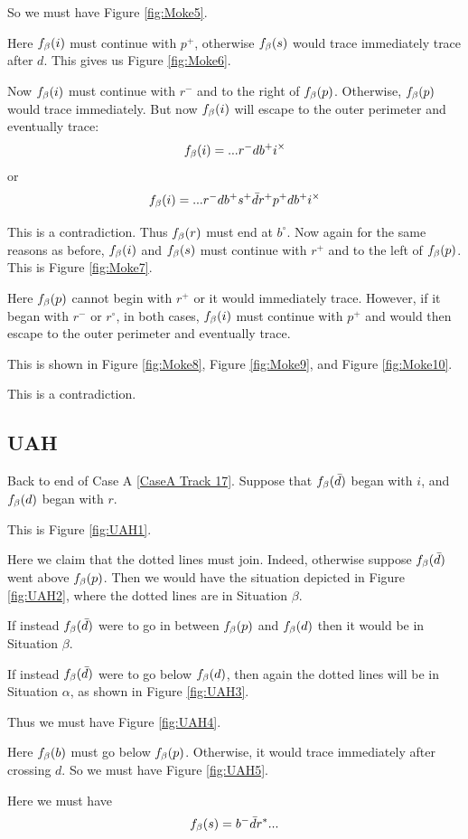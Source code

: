 So we must have Figure \ref{fig:Moke5}.

Here $f_\beta(i)$ must continue with $p^+$, otherwise $f_\beta(s)$ would trace immediately trace after $d$. This gives us Figure \ref{fig:Moke6}.

Now $f_\beta(i)$ must continue with $r^-$ and to the right of $f_\beta(p)$. Otherwise, $f_\beta(p)$ would trace immediately. But now $f_\beta(i)$ will escape to the outer perimeter and eventually trace:
\[
f_\beta(i) = ...r^- d b^+ i^\times
\]
or
\[
f_\beta(i) = ...r^- d b^+ s^+ \bar{d} r^+ p^+ d b^+ i^\times
\]

This is a contradiction. Thus $f_\beta(r)$ must end at $b^\circ$. Now again for the same reasons as before, $f_\beta(i)$ and $f_\beta(s)$ must continue with $r^+$ and to the left of $f_\beta(p)$. This is Figure \ref{fig:Moke7}.

Here $f_\beta(p)$ cannot begin with $r^+$ or it would immediately trace. However, if it began with $r^-$ or $r^\circ$, in both cases, $f_\beta(i)$ must continue with $p^+$ and would then escape to the outer perimeter and eventually trace.

This is shown in Figure \ref{fig:Moke8}, Figure \ref{fig:Moke9}, and Figure \ref{fig:Moke10}.

This is a contradiction.

\subsection{UAH}\label{UAH}
Back to end of Case A \ref{CaseA Track 17}. Suppose that $f_\beta(\bar{d})$ began with $i$, and $f_\beta(d)$ began with $r$.

This is Figure \ref{fig:UAH1}.

Here we claim that the dotted lines must join. Indeed, otherwise suppose $f_\beta(\bar{d})$ went above $f_\beta(p)$. Then we would have the situation depicted in Figure \ref{fig:UAH2}, where the dotted lines are in Situation $\beta$.

If instead $f_\beta(\bar{d})$ were to go in between $f_\beta(p)$ and $f_\beta(d)$ then it would be in Situation $\beta$.

If instead $f_\beta(\bar{d})$ were to go below $f_\beta(d)$, then again the dotted lines will be in Situation $\alpha$, as shown in Figure \ref{fig:UAH3}.

Thus we must have Figure \ref{fig:UAH4}.

Here $f_\beta(b)$ must go below $f_\beta(p)$. Otherwise, it would trace immediately after crossing $d$. So we must have Figure \ref{fig:UAH5}.

Here we must have
\[
f_\beta(s) = b^- \bar{d} r^*...
\]

